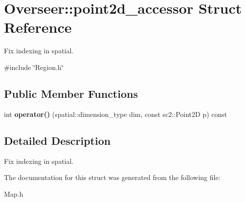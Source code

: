 \hypertarget{structOverseer_1_1point2d__accessor}{}\section{Overseer\+:\+:point2d\+\_\+accessor Struct Reference}
\label{structOverseer_1_1point2d__accessor}


Fix indexing in spatial.  




{\ttfamily \#include \char`\"{}Region.\+h\char`\"{}}

\subsection*{Public Member Functions}
\begin{DoxyCompactItemize}
\item 
int {\bfseries operator()} (spatial\+::dimension\+\_\+type dim, const sc2\+::\+Point2D p) const \hypertarget{structOverseer_1_1point2d__accessor_a739cdd045d2dd5efd6e5788f181ff807}{}\label{structOverseer_1_1point2d__accessor_a739cdd045d2dd5efd6e5788f181ff807}

\end{DoxyCompactItemize}


\subsection{Detailed Description}
Fix indexing in spatial. 

The documentation for this struct was generated from the following file\+:\begin{DoxyCompactItemize}
\item 
Map.\+h\end{DoxyCompactItemize}
